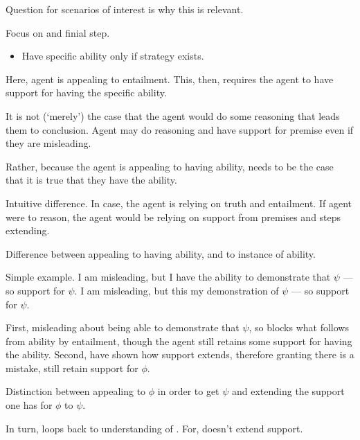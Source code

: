 \begin{note}
  Question for scenarios of interest is why this is relevant.

  Focus on \AR{} and finial step.
  \begin{itemize}
  \item Have specific ability only if strategy exists.
  \end{itemize}
  Here, agent is appealing to entailment.
  This, then, requires the agent to have support for having the specific ability.

  It is not (`merely') the case that the agent would do some reasoning that leads them to conclusion.
  Agent may do reasoning and have support for premise even if they are misleading.

  Rather, because the agent is appealing to having ability, needs to be the case that it is true that they have the ability.

  Intuitive difference.
  In \AR{} case, the agent is relying on truth and entailment.
  If agent were to reason, the agent would be relying on support from premises and steps extending.

  Difference between appealing to having ability, and to instance of ability.

  Simple example.
  I am misleading, but I have the ability to demonstrate that \(\psi\) --- so support for \(\psi\).
  I am misleading, but this my demonstration of \(\psi\) --- so support for \(\psi\).

  First, misleading about being able to demonstrate that \(\psi\), so blocks what follows from ability by entailment, though the agent still retains some support for having the ability.
  Second, have shown how support extends, therefore granting there is a mistake, still retain support for \(\phi\).

  Distinction between appealing to \(\phi\) in order to get \(\psi\) and extending the support one has for \(\phi\) to \(\psi\).

  In turn, loops back to understanding of \nI{}.
  For, \nI{} doesn't extend support.
\end{note}


